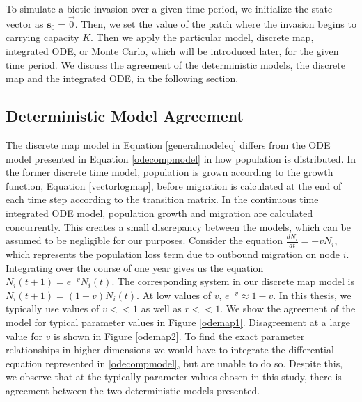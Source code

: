 \documentclass[12pt, openany]{book}
\theoremstyle{definition}
\theoremstyle{remark}
\numberwithin{equation}{chapter}
\numberwithin{figure}{chapter}
\begin{document}
To simulate a biotic invasion over a given time period, we initialize the state vector as $\mathbf{s}_{0} = \vec{0}$. Then, we set the value of the patch where the invasion begins to carrying capacity $K$. Then we apply the particular model, discrete map, integrated ODE, or Monte Carlo, which will be introduced later, for the given time period. We discuss the agreement of the deterministic models, the discrete map and the integrated ODE, in the following section. 

\subsection{Deterministic Model Agreement}

The discrete map model in Equation \ref{generalmodeleq} differs from the ODE model presented in Equation \ref{odecompmodel} in how population is distributed. In the former discrete time model, population is grown according to the growth function, Equation \ref{vectorlogmap}, before migration is calculated at the end of each time step according to the transition matrix. In the continuous time integrated ODE model, population growth and migration are calculated concurrently. This creates a small discrepancy between the models, which can be assumed to be negligible for our purposes. Consider the equation $\frac{dN_i}{dt} = -vN_i$, which represents the population loss term due to outbound migration on node $i$. Integrating over the course of one year gives us the equation $N_i(t+1) = e^{-v}N_i(t)$. The corresponding system in our discrete map model is $N_i(t+1) = (1-v)N_i(t)$. At low values of $v$, $e^{-v} \approx 1-v$. In this thesis, we typically use values of $v << 1$ as well as $r << 1$. We show the agreement of the model for typical parameter values in Figure \ref{odemap1}. Disagreement at a large value for $v$ is shown in Figure \ref{odemap2}. To find the exact parameter relationships in higher dimensions we would have to integrate the differential equation represented in \ref{odecompmodel}, but are unable to do so. Despite this, we observe that at the typically parameter values chosen in this study, there is agreement between the two deterministic models presented.
\end{document}
